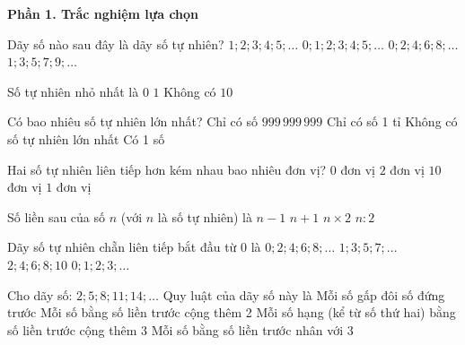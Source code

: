 \textbf{Phần 1. Trắc nghiệm lựa chọn}

\begin{ex} %
Dãy số nào sau đây là dãy số tự nhiên?
\choice
{$1; 2; 3; 4; 5; \dots$}
{\True $0; 1; 2; 3; 4; 5; \dots$}
{$0; 2; 4; 6; 8; \dots$}
{$1; 3; 5; 7; 9; \dots$}
\end{ex}

\begin{ex} %
Số tự nhiên nhỏ nhất là
\choice
{\True $0$}
{$1$}
{Không có}
{$10$}
\end{ex}

\begin{ex} %
Có bao nhiêu số tự nhiên lớn nhất?
\choice
{Chỉ có số $999\,999\,999$}
{Chỉ có số 1 tỉ}
{\True Không có số tự nhiên lớn nhất}
{Có 1 số}
\end{ex}

\begin{ex} %
Hai số tự nhiên liên tiếp hơn kém nhau bao nhiêu đơn vị?
\choice
{$0$ đơn vị}
{$2$ đơn vị}
{$10$ đơn vị}
{\True $1$ đơn vị}
\end{ex}

\begin{ex} %
Số liền sau của số $n$ (với $n$ là số tự nhiên) là
\choice
{$n - 1$}
{\True $n + 1$}
{$n \times 2$}
{$n : 2$}
\end{ex}

\begin{ex} %
Dãy số tự nhiên chẵn liên tiếp bắt đầu từ 0 là
\choice
{\True $0; 2; 4; 6; 8; \dots$}
{$1; 3; 5; 7; \dots$}
{$2; 4; 6; 8; 10$}
{$0; 1; 2; 3; \dots$}
\end{ex}

\begin{ex} %
Cho dãy số: $2; 5; 8; 11; 14; \dots$ Quy luật của dãy số này là
\choice
{Mỗi số gấp đôi số đứng trước}
{Mỗi số bằng số liền trước cộng thêm 2}
{\True Mỗi số hạng (kể từ số thứ hai) bằng số liền trước cộng thêm 3}
{Mỗi số bằng số liền trước nhân với 3}
\end{ex}

